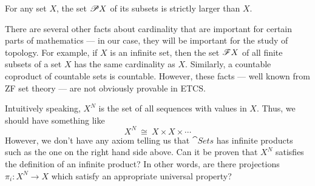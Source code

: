 \begin{cor} For any set $X$, the set $\mathscr P X$ of its subsets is
  strictly larger than $X$. \end{cor}


There are several other facts about cardinality that are important for
certain parts of mathematics --- in our case, they will be important
for the study of topology.  For example, if $X$ is an infinite set,
then the set $\mathscr F X$ of all finite subsets of a set $X$ has the same
cardinality as $X$.  Similarly, a countable coproduct of countable
sets is countable.  However, these facts --- well known from ZF set
theory --- are not obviously provable in ETCS.

\begin{disc} Intuitively speaking, $X^N$ is the set of all sequences
  with values in $X$.  Thus, we should have something like
  \[ X^N \: \cong \: X\times X\times \cdots \] However, we don't have
  any axiom telling us that $\cat{Sets}$ has infinite products such as
  the one on the right hand side above.  Can it be proven that $X^N$
  satisfies the definition of an infinite product?  In other words,
  are there projections $\pi _i:X^N\to X$ which satisfy an appropriate
  universal property? \end{disc}















